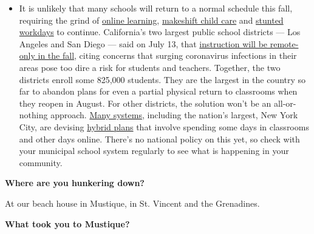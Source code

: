 \begin{itemize}
  \begin{itemize}
  \tightlist
  \item
    It is unlikely that many schools will return to a normal schedule
    this fall, requiring the grind of
    \href{https://www.nytimes.com/2020/06/05/us/coronavirus-education-lost-learning.html?action=click\&pgtype=Article\&state=default\&region=MAIN_CONTENT_3\&context=storylines_faq}{online
    learning},
    \href{https://www.nytimes.com/2020/05/29/us/coronavirus-child-care-centers.html?action=click\&pgtype=Article\&state=default\&region=MAIN_CONTENT_3\&context=storylines_faq}{makeshift
    child care} and
    \href{https://www.nytimes.com/2020/06/03/business/economy/coronavirus-working-women.html?action=click\&pgtype=Article\&state=default\&region=MAIN_CONTENT_3\&context=storylines_faq}{stunted
    workdays} to continue. California's two largest public school
    districts --- Los Angeles and San Diego --- said on July 13, that
    \href{https://www.nytimes.com/2020/07/13/us/lausd-san-diego-school-reopening.html?action=click\&pgtype=Article\&state=default\&region=MAIN_CONTENT_3\&context=storylines_faq}{instruction
    will be remote-only in the fall}, citing concerns that surging
    coronavirus infections in their areas pose too dire a risk for
    students and teachers. Together, the two districts enroll some
    825,000 students. They are the largest in the country so far to
    abandon plans for even a partial physical return to classrooms when
    they reopen in August. For other districts, the solution won't be an
    all-or-nothing approach.
    \href{https://bioethics.jhu.edu/research-and-outreach/projects/eschool-initiative/school-policy-tracker/}{Many
    systems}, including the nation's largest, New York City, are
    devising
    \href{https://www.nytimes.com/2020/06/26/us/coronavirus-schools-reopen-fall.html?action=click\&pgtype=Article\&state=default\&region=MAIN_CONTENT_3\&context=storylines_faq}{hybrid
    plans} that involve spending some days in classrooms and other days
    online. There's no national policy on this yet, so check with your
    municipal school system regularly to see what is happening in your
    community.
  \end{itemize}
\end{itemize}

\textbf{Where are you hunkering down?}

At our beach house in Mustique, in St. Vincent and the Grenadines.

\textbf{What took you to Mustique?}

